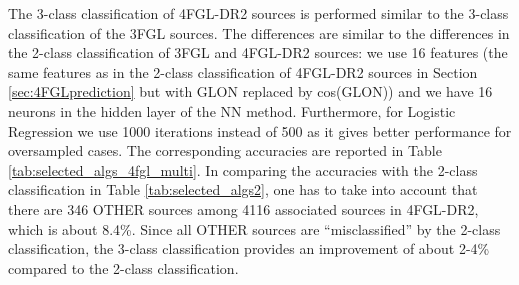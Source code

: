 The 3-class classification of 4FGL-DR2 sources is performed similar to the 3-class classification of the 3FGL sources.
The differences are similar to the differences in the 2-class classification of 3FGL and 4FGL-DR2 sources:
we use 16 features (the same features as in the 2-class classification of 4FGL-DR2 sources in Section \ref{sec:4FGLprediction} but with GLON replaced by cos(GLON))
and we have 16 neurons in the hidden layer of the NN method. Furthermore, for Logistic Regression we use 1000 iterations instead of 500 as it gives better performance for oversampled cases.
The corresponding accuracies are reported in Table \ref{tab:selected_algs_4fgl_multi}.
In comparing the accuracies with the 2-class classification in Table \ref{tab:selected_algs2}, 
one has to take into account that there are 346 OTHER sources among 4116 associated sources in 4FGL-DR2, which is about 8.4\%.
Since all OTHER sources are ``misclassified'' by the 2-class classification, the 3-class classification provides an improvement of about 2-4\% compared to the 2-class classification.

\begin{table}[!h]
\hspace{-0.2cm}
    \vspace{2mm}
    \caption{Testing accuracy of the four selected algorithms for the 3-class classification of 4FGL-DR2 sources. 
    ``\_O'' denotes training with oversampling.}
    \label{tab:selected_algs_4fgl_multi}
\end{table}



